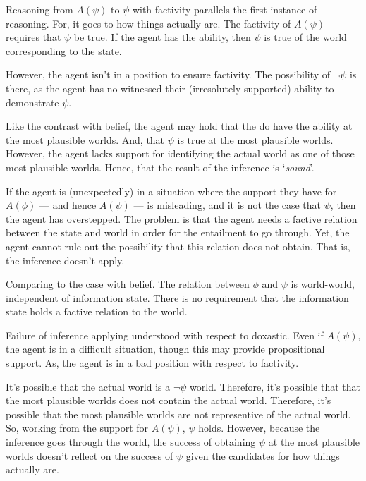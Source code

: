 \documentclass[10pt]{article}
\begin{document}
\begin{note}
Reasoning from \(A(\psi)\) to \(\psi\) with factivity parallels the first instance of reasoning.
For, it goes to how things actually are.
The factivity of \(A(\psi)\) requires that \(\psi\) be true.
If the agent has the ability, then \(\psi\) is true of the world corresponding to the state.

However, the agent isn't in a position to ensure factivity.
The possibility of \(\lnot\psi\) is there, as the agent has no witnessed their (irresolutely supported) ability to demonstrate \(\psi\).

Like the contrast with belief, the agent may hold that the do have the ability at the most plausible worlds.
And, that \(\psi\) is true at the most plausible worlds.
However, the agent lacks support for identifying the actual world as one of those most plausible worlds.
Hence, that the result of the inference is `\emph{sound}'.

If the agent is (unexpectedly) in a situation where the support they have for \(A(\phi)\) --- and hence \(A(\psi)\) --- is misleading, and it is not the case that \(\psi\), then the agent has overstepped.
The problem is that the agent needs a factive relation between the state and world in order for the entailment to go through.
Yet, the agent cannot rule out the possibility that this relation does not obtain.
That is, the inference doesn't apply.

Comparing to the case with belief.
The relation between \(\phi\) and \(\psi\) is world-world, independent of information state.
There is no requirement that the information state holds a factive relation to the world.


Failure of inference applying understood with respect to doxastic.
Even if \(A(\psi)\), the agent is in a difficult situation, though this may provide propositional support.
As, the agent is in a bad position with respect to factivity.

It's possible that the actual world is a \(\lnot\psi\) world.
Therefore, it's possible that that the most plausible worlds does not contain the actual world.
Therefore, it's possible that the most plausible worlds are not representive of the actual world.
So, working from the support for \(A(\psi)\), \(\psi\) holds.
However, because the inference goes through the world, the success of obtaining \(\psi\) at the most plausible worlds doesn't reflect on the success of \(\psi\) given the candidates for how things actually are.


\end{note}
\end{document}
